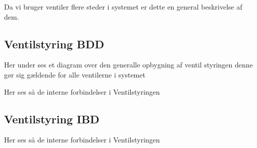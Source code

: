 
Da vi bruger ventiler flere steder i systemet er dette en general beskrivelse af dem.

\subsection{Ventilstyring BDD}

Her under ses et diagram over den generalle opbygning af ventil styringen denne gør sig gældende for alle ventilerne i systemet


Her ses så de interne forbindelser i Ventilstyringen 

\subsection{Ventilstyring IBD}

Her ses så de interne forbindelser i Ventilstyringen 


